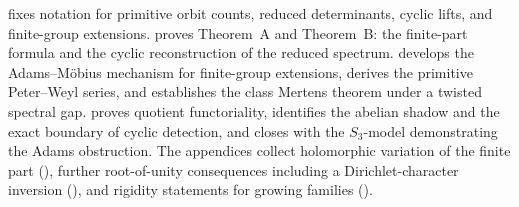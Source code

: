  fixes notation for primitive orbit counts,
reduced determinants, cyclic lifts, and finite-group extensions.
 proves Theorem~A and Theorem~B:
the finite-part formula and the cyclic reconstruction of the reduced
spectrum.  develops the
Adams--M\"obius mechanism for finite-group extensions, derives the
primitive Peter--Weyl series, and establishes the class Mertens theorem
under a twisted spectral gap.  proves quotient
functoriality, identifies the abelian shadow and the exact boundary of
cyclic detection, and closes with the \(S_3\)-model demonstrating the
Adams obstruction. The appendices collect holomorphic variation of the
finite part (), further root-of-unity consequences
including a Dirichlet-character inversion (), and
rigidity statements for growing families ().

